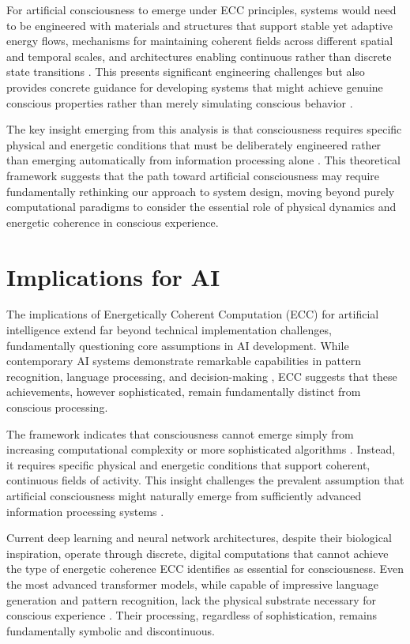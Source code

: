 \begin{refsection}
For artificial consciousness to emerge under ECC principles, systems would need to be engineered with materials and structures that support stable yet adaptive energy flows, mechanisms for maintaining coherent fields across different spatial and temporal scales, and architectures enabling continuous rather than discrete state transitions \cite{Pfeifer2006}. This presents significant engineering challenges but also provides concrete guidance for developing systems that might achieve genuine conscious properties rather than merely simulating conscious behavior \cite{Clark2013}.

The key insight emerging from this analysis is that consciousness requires specific physical and energetic conditions that must be deliberately engineered rather than emerging automatically from information processing alone \cite{DiPaolo2005}. This theoretical framework suggests that the path toward artificial consciousness may require fundamentally rethinking our approach to system design, moving beyond purely computational paradigms to consider the essential role of physical dynamics and energetic coherence in conscious experience.

\section{Implications for AI}

The implications of Energetically Coherent Computation (ECC) for artificial intelligence extend far beyond technical implementation challenges, fundamentally questioning core assumptions in AI development. While contemporary AI systems demonstrate remarkable capabilities in pattern recognition, language processing, and decision-making \cite{Marcus2019}, ECC suggests that these achievements, however sophisticated, remain fundamentally distinct from conscious processing.

The framework indicates that consciousness cannot emerge simply from increasing computational complexity or more sophisticated algorithms \cite{Dreyfus1992}. Instead, it requires specific physical and energetic conditions that support coherent, continuous fields of activity. This insight challenges the prevalent assumption that artificial consciousness might naturally emerge from sufficiently advanced information processing systems \cite{Bostrom2014}.

Current deep learning and neural network architectures, despite their biological inspiration, operate through discrete, digital computations that cannot achieve the type of energetic coherence ECC identifies as essential for consciousness. Even the most advanced transformer models, while capable of impressive language generation and pattern recognition, lack the physical substrate necessary for conscious experience \cite{Lake2017}. Their processing, regardless of sophistication, remains fundamentally symbolic and discontinuous.


\end{refsection}
